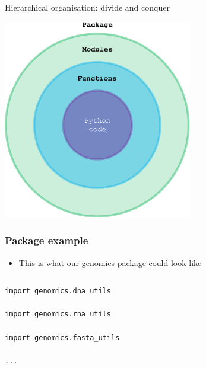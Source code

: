 \documentclass[xcolor=table]{beamer}
\begin{document}
\begin{frame}{Hierarchical organisation: divide and conquer}

\begin{center}
	\includegraphics[width=0.62\textwidth, keepaspectratio]{package.pdf}
\end{center}

\end{frame}

\begin{frame}[fragile]
\frametitle{Package example}

\begin{itemize}
	\item This is what our genomics package could look like
\end{itemize}

\begin{columns}


\begin{lstlisting}[style=python]
import genomics.dna_utils

import genomics.rna_utils

import genomics.fasta_utils

...
\end{lstlisting}
\end{columns}

\end{frame}
\end{document}
